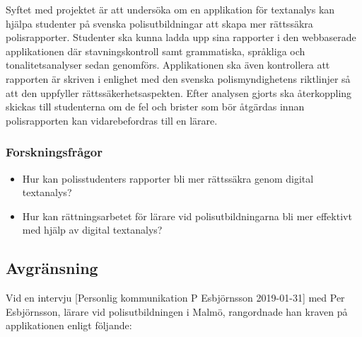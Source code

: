\documentclass[swedish]{maucsthesis}
\begin{document}
Syftet med projektet är att undersöka om en applikation för textanalys kan
hjälpa studenter på svenska polisutbildningar att skapa mer rättssäkra
polisrapporter. Studenter ska kunna ladda upp sina rapporter i den webbaserade
applikationen där stavningskontroll samt grammatiska, språkliga och
tonalitetsanalyser sedan genomförs. Applikationen ska även kontrollera att rapporten
är skriven i enlighet med den svenska polismyndighetens riktlinjer så att den
uppfyller rättssäkerhetsaspekten. Efter analysen gjorts ska
återkoppling skickas till studenterna om de fel och brister som bör åtgärdas innan
polisrapporten kan vidarebefordras till en lärare.

\subsubsection{Forskningsfrågor}

\begin{itemize}
\item Hur kan polisstudenters rapporter bli mer rättssäkra genom digital
  textanalys?
\item Hur kan rättningsarbetet för lärare vid polisutbildningarna bli mer
  effektivt med hjälp av digital textanalys?
\end{itemize}

\subsection{Avgränsning}\label{avgränsning}

Vid en intervju [Personlig kommunikation P Esbjörnsson 2019-01-31] med Per Esbjörnsson, lärare vid polisutbildningen i Malmö, rangordnade han kraven på applikationen enligt följande:
\end{document}
